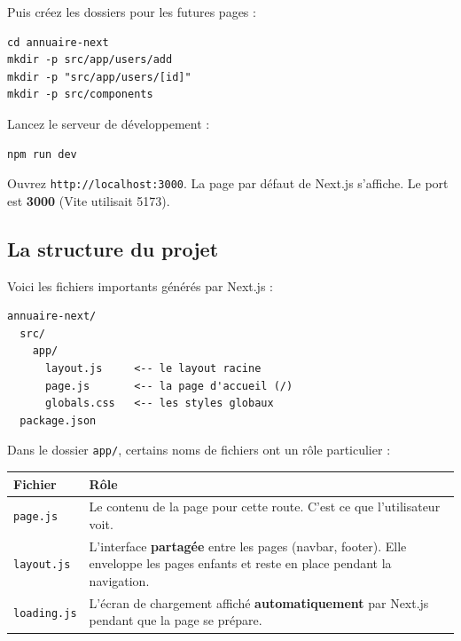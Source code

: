 \documentclass[11pt,a4paper]{article}
\begin{document}
Puis créez les dossiers pour les futures pages :

\begin{lstlisting}[style=terminal]
cd annuaire-next
mkdir -p src/app/users/add
mkdir -p "src/app/users/[id]"
mkdir -p src/components
\end{lstlisting}

Lancez le serveur de développement :

\begin{lstlisting}[style=terminal]
npm run dev
\end{lstlisting}

Ouvrez \texttt{http://localhost:3000}. La page par défaut de Next.js s'affiche. Le port est \textbf{3000} (Vite utilisait 5173).

\subsection{La structure du projet}

Voici les fichiers importants générés par Next.js :

\begin{lstlisting}[style=terminal]
annuaire-next/
  src/
    app/
      layout.js     <-- le layout racine
      page.js       <-- la page d'accueil (/)
      globals.css   <-- les styles globaux
  package.json
\end{lstlisting}

\begin{retenirbox}
Dans le dossier \texttt{app/}, certains noms de fichiers ont un rôle particulier :

\begin{center}
\begin{tabular}{lp{8cm}}
\toprule
\textbf{Fichier} & \textbf{Rôle} \\
\midrule
\texttt{page.js} & Le contenu de la page pour cette route. C'est ce que l'utilisateur voit. \\
\texttt{layout.js} & L'interface \textbf{partagée} entre les pages (navbar, footer). Elle enveloppe les pages enfants et reste en place pendant la navigation. \\
\texttt{loading.js} & L'écran de chargement affiché \textbf{automatiquement} par Next.js pendant que la page se prépare. \\
\bottomrule
\end{tabular}
\end{center}
\end{retenirbox}
\end{document}
